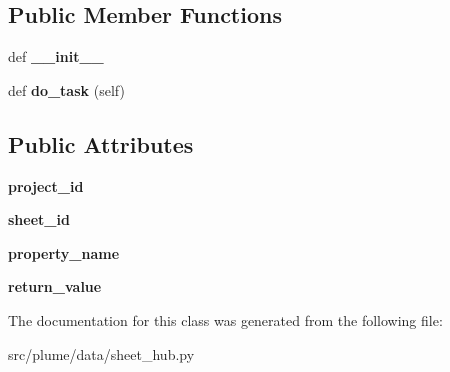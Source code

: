 \subsection*{Public Member Functions}
\begin{DoxyCompactItemize}
\item 
def {\bfseries \+\_\+\+\_\+init\+\_\+\+\_\+}\hypertarget{classplume-creator_1_1src_1_1plume_1_1data_1_1sheet__hub_1_1_get_property_ae6520b9f358228f2ece67b573f58235d}{}\label{classplume-creator_1_1src_1_1plume_1_1data_1_1sheet__hub_1_1_get_property_ae6520b9f358228f2ece67b573f58235d}

\item 
def {\bfseries do\+\_\+task} (self)\hypertarget{classplume-creator_1_1src_1_1plume_1_1data_1_1sheet__hub_1_1_get_property_af7ae184174a8e667d8641aad9c45a069}{}\label{classplume-creator_1_1src_1_1plume_1_1data_1_1sheet__hub_1_1_get_property_af7ae184174a8e667d8641aad9c45a069}

\end{DoxyCompactItemize}
\subsection*{Public Attributes}
\begin{DoxyCompactItemize}
\item 
{\bfseries project\+\_\+id}\hypertarget{classplume-creator_1_1src_1_1plume_1_1data_1_1sheet__hub_1_1_get_property_ac277c969776447e8e893552c49809830}{}\label{classplume-creator_1_1src_1_1plume_1_1data_1_1sheet__hub_1_1_get_property_ac277c969776447e8e893552c49809830}

\item 
{\bfseries sheet\+\_\+id}\hypertarget{classplume-creator_1_1src_1_1plume_1_1data_1_1sheet__hub_1_1_get_property_aecba9df40e5f0ebb50b5bd27fe3f1458}{}\label{classplume-creator_1_1src_1_1plume_1_1data_1_1sheet__hub_1_1_get_property_aecba9df40e5f0ebb50b5bd27fe3f1458}

\item 
{\bfseries property\+\_\+name}\hypertarget{classplume-creator_1_1src_1_1plume_1_1data_1_1sheet__hub_1_1_get_property_a8bbf1bb1c01861bd1e77af95c13c6acf}{}\label{classplume-creator_1_1src_1_1plume_1_1data_1_1sheet__hub_1_1_get_property_a8bbf1bb1c01861bd1e77af95c13c6acf}

\item 
{\bfseries return\+\_\+value}\hypertarget{classplume-creator_1_1src_1_1plume_1_1data_1_1sheet__hub_1_1_get_property_a07e6d867c46228c2af202c814930d8e3}{}\label{classplume-creator_1_1src_1_1plume_1_1data_1_1sheet__hub_1_1_get_property_a07e6d867c46228c2af202c814930d8e3}

\end{DoxyCompactItemize}


The documentation for this class was generated from the following file\+:\begin{DoxyCompactItemize}
\item 
src/plume/data/sheet\+\_\+hub.\+py\end{DoxyCompactItemize}
